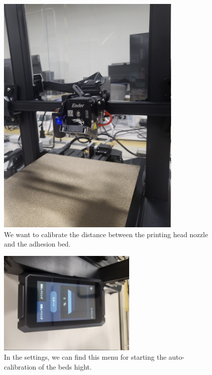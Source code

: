 \documentclass[a4paper,11pt]{article}
\begin{document}
\begin{figure}[H]
    \centering 
    \includegraphics[width=0.8\textwidth]{img/ender/1.jpg} 
    \caption{We want to calibrate the distance between the printing head nozzle and the adhesion bed.}
    \label{fig:ender1}
\end{figure}
  
\begin{figure}[H]
    \centering 
    \includegraphics[width=0.6\textwidth]{img/ender/2.jpg} 
    \caption{In the settings, we can find this menu for starting the auto-calibration of the beds hight.}
    \label{fig:ender2}
\end{figure}
\end{document}
